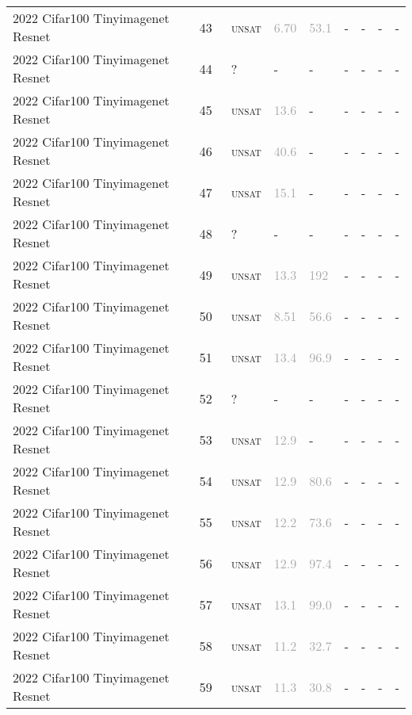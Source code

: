 \begin{center}
{\begin{longtable}{@{}lllllllll@{}}
2022 Cifar100 Tinyimagenet Resnet & 43 & ~\textsc{unsat} & \textcolor{darkgray}{6.70} & \textcolor{darkgray}{53.1} & - & - & - & - \\
2022 Cifar100 Tinyimagenet Resnet & 44 & ~? & - & - & - & - & - & - \\
2022 Cifar100 Tinyimagenet Resnet & 45 & ~\textsc{unsat} & \textcolor{darkgray}{13.6} & - & - & - & - & - \\
2022 Cifar100 Tinyimagenet Resnet & 46 & ~\textsc{unsat} & \textcolor{darkgray}{40.6} & - & - & - & - & - \\
2022 Cifar100 Tinyimagenet Resnet & 47 & ~\textsc{unsat} & \textcolor{darkgray}{15.1} & - & - & - & - & - \\
2022 Cifar100 Tinyimagenet Resnet & 48 & ~? & - & - & - & - & - & - \\
2022 Cifar100 Tinyimagenet Resnet & 49 & ~\textsc{unsat} & \textcolor{darkgray}{13.3} & \textcolor{darkgray}{192} & - & - & - & - \\
2022 Cifar100 Tinyimagenet Resnet & 50 & ~\textsc{unsat} & \textcolor{darkgray}{8.51} & \textcolor{darkgray}{56.6} & - & - & - & - \\
2022 Cifar100 Tinyimagenet Resnet & 51 & ~\textsc{unsat} & \textcolor{darkgray}{13.4} & \textcolor{darkgray}{96.9} & - & - & - & - \\
2022 Cifar100 Tinyimagenet Resnet & 52 & ~? & - & - & - & - & - & - \\
2022 Cifar100 Tinyimagenet Resnet & 53 & ~\textsc{unsat} & \textcolor{darkgray}{12.9} & - & - & - & - & - \\
2022 Cifar100 Tinyimagenet Resnet & 54 & ~\textsc{unsat} & \textcolor{darkgray}{12.9} & \textcolor{darkgray}{80.6} & - & - & - & - \\
2022 Cifar100 Tinyimagenet Resnet & 55 & ~\textsc{unsat} & \textcolor{darkgray}{12.2} & \textcolor{darkgray}{73.6} & - & - & - & - \\
2022 Cifar100 Tinyimagenet Resnet & 56 & ~\textsc{unsat} & \textcolor{darkgray}{12.9} & \textcolor{darkgray}{97.4} & - & - & - & - \\
2022 Cifar100 Tinyimagenet Resnet & 57 & ~\textsc{unsat} & \textcolor{darkgray}{13.1} & \textcolor{darkgray}{99.0} & - & - & - & - \\
2022 Cifar100 Tinyimagenet Resnet & 58 & ~\textsc{unsat} & \textcolor{darkgray}{11.2} & \textcolor{darkgray}{32.7} & - & - & - & - \\
2022 Cifar100 Tinyimagenet Resnet & 59 & ~\textsc{unsat} & \textcolor{darkgray}{11.3} & \textcolor{darkgray}{30.8} & - & - & - & - \\

\end{longtable}}
\end{center}
